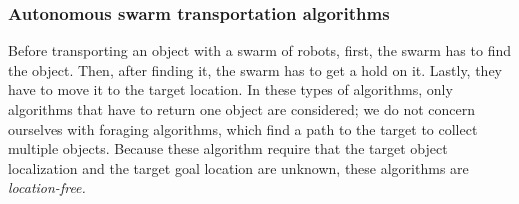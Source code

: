 \subsubsection{Autonomous swarm transportation algorithms}
Before transporting an object with a swarm of robots, first, the swarm has to find the object. Then, after finding it, the swarm has to get a hold on it. Lastly, they have to move it to the target location. In these types of algorithms, only algorithms that have to return one object are considered; we do not concern ourselves with foraging algorithms, which find  a path to the target to collect multiple objects. Because these algorithm require that the target object localization and the target goal location are unknown, these algorithms are\emph{ location-free.} \\

